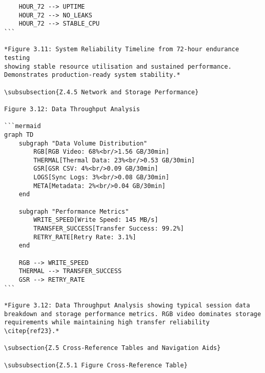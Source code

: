 \begin{verbatim}
    HOUR_72 --> UPTIME
    HOUR_72 --> NO_LEAKS
    HOUR_72 --> STABLE_CPU
```

*Figure 3.11: System Reliability Timeline from 72-hour endurance testing
showing stable resource utilisation and sustained performance.
Demonstrates production-ready system stability.*

\subsubsection{Z.4.5 Network and Storage Performance}

Figure 3.12: Data Throughput Analysis

```mermaid
graph TD
    subgraph "Data Volume Distribution"
        RGB[RGB Video: 68%<br/>1.56 GB/30min]
        THERMAL[Thermal Data: 23%<br/>0.53 GB/30min]
        GSR[GSR CSV: 4%<br/>0.09 GB/30min]
        LOGS[Sync Logs: 3%<br/>0.08 GB/30min]
        META[Metadata: 2%<br/>0.04 GB/30min]
    end

    subgraph "Performance Metrics"
        WRITE_SPEED[Write Speed: 145 MB/s]
        TRANSFER_SUCCESS[Transfer Success: 99.2%]
        RETRY_RATE[Retry Rate: 3.1%]
    end

    RGB --> WRITE_SPEED
    THERMAL --> TRANSFER_SUCCESS
    GSR --> RETRY_RATE
```

*Figure 3.12: Data Throughput Analysis showing typical session data
breakdown and storage performance metrics. RGB video dominates storage
requirements while maintaining high transfer reliability \citep{ref23}.*

\subsection{Z.5 Cross-Reference Tables and Navigation Aids}

\subsubsection{Z.5.1 Figure Cross-Reference Table}


\end{verbatim}

